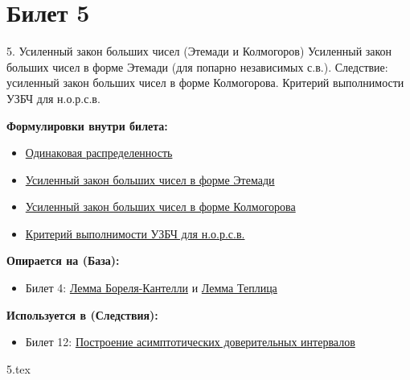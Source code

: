 \documentclass[a4paper, 12pt]{article}
\newcommand{\ticketsection}[1]{\vspace{0.5em}\noindent\textbf{\textcolor{ticketdark}{\sffamily #1}}\par}
\begin{document}
\section{Билет 5}
\begin{ticketskeleton}{5. Усиленный закон больших чисел (Этемади и Колмогоров)}
     Усиленный закон больших чисел в форме Этемади (для попарно независимых с.в.). Следствие: усиленный закон больших чисел в форме Колмогорова. Критерий выполнимости УЗБЧ для н.о.р.с.в.

    \ticketsection{Формулировки внутри билета:}
    \begin{itemize}
        \item \hyperref[def:id_dist]{ Одинаковая распределенность}
        \item \hyperref[thm:slln_etemadi]{ Усиленный закон больших чисел в форме Этемади}
        \item \hyperref[cor:slln_kolm]{ Усиленный закон больших чисел в форме Колмогорова}
        \item \hyperref[cor:crit_slln]{ Критерий выполнимости УЗБЧ для н.о.р.с.в.}
    \end{itemize}

    \ticketsection{Опирается на (База):}
    \begin{itemize}
        \item Билет 4: \hyperref[lem:borel_cantelli]{Лемма Бореля-Кантелли} и \hyperref[lem:toeplitz]{Лемма Теплица}
    \end{itemize}

    \ticketsection{Используется в (Следствия):}
    \begin{itemize}
        \item Билет 12: \hyperref[ex:ci_bernoulli]{Построение асимптотических доверительных интервалов}
    \end{itemize}
\end{ticketskeleton}
{5.tex}
\end{document}
